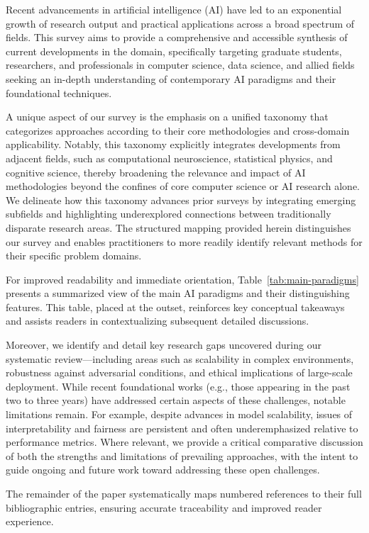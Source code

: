 \documentclass[sigconf]{acmart}
\begin{document}
Recent advancements in artificial intelligence (AI) have led to an exponential growth of research output and practical applications across a broad spectrum of fields. This survey aims to provide a comprehensive and accessible synthesis of current developments in the domain, specifically targeting graduate students, researchers, and professionals in computer science, data science, and allied fields seeking an in-depth understanding of contemporary AI paradigms and their foundational techniques.

A unique aspect of our survey is the emphasis on a unified taxonomy that categorizes approaches according to their core methodologies and cross-domain applicability. Notably, this taxonomy explicitly integrates developments from adjacent fields, such as computational neuroscience, statistical physics, and cognitive science, thereby broadening the relevance and impact of AI methodologies beyond the confines of core computer science or AI research alone. We delineate how this taxonomy advances prior surveys by integrating emerging subfields and highlighting underexplored connections between traditionally disparate research areas. The structured mapping provided herein distinguishes our survey and enables practitioners to more readily identify relevant methods for their specific problem domains.

For improved readability and immediate orientation, Table~\ref{tab:main-paradigms} presents a summarized view of the main AI paradigms and their distinguishing features. This table, placed at the outset, reinforces key conceptual takeaways and assists readers in contextualizing subsequent detailed discussions.

Moreover, we identify and detail key research gaps uncovered during our systematic review—including areas such as scalability in complex environments, robustness against adversarial conditions, and ethical implications of large-scale deployment. While recent foundational works (e.g., those appearing in the past two to three years) have addressed certain aspects of these challenges, notable limitations remain. For example, despite advances in model scalability, issues of interpretability and fairness are persistent and often underemphasized relative to performance metrics. Where relevant, we provide a critical comparative discussion of both the strengths and limitations of prevailing approaches, with the intent to guide ongoing and future work toward addressing these open challenges.

The remainder of the paper systematically maps numbered references to their full bibliographic entries, ensuring accurate traceability and improved reader experience.
\end{document}
